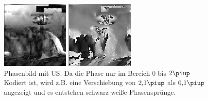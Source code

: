 \documentclass[
    11pt,
    ngerman
]{scrbook}
\begin{document}
\begin{figure}[htbp]
    \begin{minipage}[htbp]{.48\textwidth}
        \centering
        \includegraphics[width=.8\textwidth]{Abbildungen/2014-11-27_18_1_amp_kontrast.png}
        \caption{%
            Amplitudenbild mit US. Oben im Bild sind der Spiegel und Verwirbelungen im Wasser durch den Ultraschall zu sehen. Auf Höhe der Mitte sind Bildstörungen zu erkennen.
        }
        \label{fig:prob1_ampl_US}
    \end{minipage}
    \hfill
    \begin{minipage}[htbp]{.48\textwidth}
        \centering
        \includegraphics[width=.8\textwidth]{Abbildungen/2014-11-27_19_1_phase.png}
        \caption{%
            Phasenbild mit US. Da die Phase nur im Bereich 0 bis $2\piup$ Kodiert ist, wird z.B. eine Verschiebung von $\num{2.1}\piup$ als $\num{.1}\piup$ angezeigt und es entstehen schwarz-weiße Phasensprünge.
        }
        \label{fig:prob1_phas_US}
    \end{minipage}
\end{figure}
\end{document}
